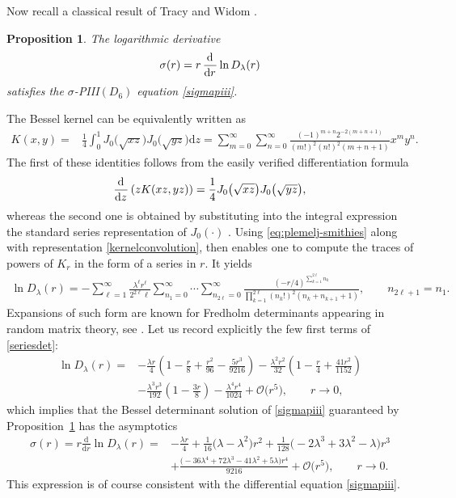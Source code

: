 \documentclass[pdftex]{sigma}
\numberwithin{equation}{section}
\newtheorem{prop}[Theorem]{Proposition}
 { \theoremstyle{definition}
\newtheorem{Definition}[Theorem]{Definition}
\newtheorem{Note}[Theorem]{Note}
\newtheorem{Example}[Theorem]{Example}
\newtheorem{Remark}[Theorem]{Remark} }
\newcommand{\dd}{\mathrm{d}}
\newcommand\lb{\left(}
\newcommand\rb{\right)}
\begin{document}
 Now recall a classical result of Tracy and Widom \cite[equation (1.21) with $\alpha = 0$]{TWBessel}.
 \begin{prop} 	
\label{prop:bessel}
 The logarithmic derivative
\begin{gather}
 \sigma(r)=r \dod{}{r}\ln D_\lambda( r) \label{eq:sigma-Fredholm-det}
\end{gather}
 satisfies the $\sigma$-{\rm PIII}$(D_6)$ equation \eqref{sigmapiii}.
 \end{prop}
The Bessel kernel can be equivalently written as
 	 	\begin{align}
 \label{kernelconvolution}	K( x,y)=& \frac14\int_{0}^1
 	J_0\big(\sqrt{xz}\big) J_0\big(\sqrt{yz}\big) \dd z = \sum_{m=0}^\infty\sum_{n=0}^\infty
 	\frac{\lb -1\rb^{m+n}2^{-2\lb m+n+1\rb}}{\lb m!\rb^2\lb n!\rb^2 \lb m+n+1\rb} x^my^n.
 	\end{align}
The first of these identities follows from the easily verified differentiation formula
\begin{gather*}
\dod{}{z}( z K( xz,yz))=\frac14 J_0\big( \sqrt{xz}\big) J_0\big( \sqrt{yz}\big),
\end{gather*}
whereas the second one is obtained by substituting into the integral expression the standard series representation of $J_0(\cdot)$ \cite[equation~(10.2.2)]{DLMF}. Using \eqref{eq:plemelj-smithies} along with representation \eqref{kernelconvolution}, then enables one to compute the traces of powers of $K_r$ in the form of a series in $r$. It yields
\begin{gather}\label{seriesdet}
 	\ln D_\lambda( r)=-\sum_{\ell=1}^\infty\frac{\lambda^\ell r^\ell}{2^{2\ell}\ell}\sum_{n_1=0}^{\infty}\cdots\sum_{n_{2\ell}=0}^\infty \frac{\lb-r/4\rb^{\sum_{k=1}^{2\ell} n_k}}{\prod_{k=1}^{2\ell}\lb n_k!\rb^2\lb n_k+n_{k+1}+1\rb},\qquad n_{2\ell+1}=n_1.
\end{gather}
Expansions of such form are known for Fredholm determinants appearing in random matrix theory, see \cite[Section 20.5]{Mehta}.
 Let us record explicitly the few first terms of \eqref{seriesdet}:
 	\begin{align*}\ln D_\lambda( r)={}& -\frac{\lambda r}{4}\lb 1-\frac{r}{8}+\frac{r^2}{96}-\frac{5r^3}{9216}\rb-\frac{\lambda^2r^2}{32}\lb 1-\frac{r}{4}+\frac{41r^2}{1152}\rb\\
 & -
 	\frac{\lambda^3r^3}{192}\lb 1-\frac{3r}{8}\rb-
 	\frac{\lambda^4r^4}{1024}+\mathcal{O}\big( r^5\big),\qquad r\to 0,
 \end{align*}
 which implies that the Bessel determinant solution of \eqref{sigmapiii} guaranteed by Proposition~\ref{prop:bessel} has the asymptotics
 	\begin{align} \sigma(r)=r\frac{\dd}{\dd r}\ln D_\lambda(r)=& -\frac{\lambda r}{4}+\frac{1}{16} \big(\lambda -\lambda ^2\big) r^2+\frac{1}{128} \bigl(-2 \lambda ^3+3 \lambda ^2-\lambda \bigr) r^3\nonumber\\& +\frac{\bigl(-36 \lambda ^4+72 \lambda ^3-41 \lambda ^2+5 \lambda \bigr) r^4}{9216}+\mathcal{O}\big( r^5\big),\qquad r\to 0. \label{eq:sigma-Bessel-expand}
 \end{align}
 This expression is of course consistent with the differential equation \eqref{sigmapiii}.
\end{document}
